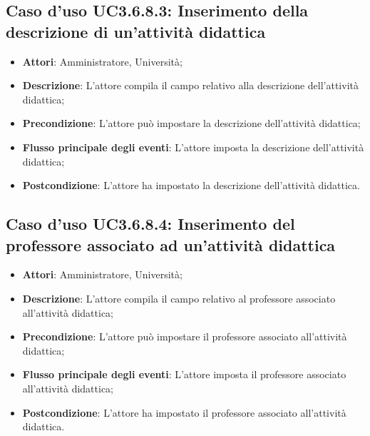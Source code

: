 \subsection{Caso d'uso \texorpdfstring{UC3.6.8.3}{UC3.6.8.3}: Inserimento della descrizione di un'attività didattica}
\begin{itemize}
\item \textbf{Attori}: Amministratore, Università;
\item \textbf{Descrizione}: L'attore compila il campo relativo alla descrizione dell'attività didattica;

\item \textbf{Precondizione}: L'attore può impostare la descrizione dell'attività didattica;

\item \textbf{Flusso principale degli eventi}: L'attore imposta la descrizione dell'attività didattica;

\item \textbf{Postcondizione}: L'attore ha impostato la descrizione dell'attività didattica.

\end{itemize}
\subsection{Caso d'uso \texorpdfstring{UC3.6.8.4}{UC3.6.8.4}: Inserimento del professore associato ad un'attività didattica}
\begin{itemize}
\item \textbf{Attori}: Amministratore, Università;
\item \textbf{Descrizione}: L'attore compila il campo relativo al professore associato all'attività didattica;

\item \textbf{Precondizione}: L'attore può impostare il professore associato all'attività didattica;

\item \textbf{Flusso principale degli eventi}: L'attore imposta il professore associato all'attività didattica;

\item \textbf{Postcondizione}: L'attore ha impostato il professore associato all'attività didattica.

\end{itemize}
